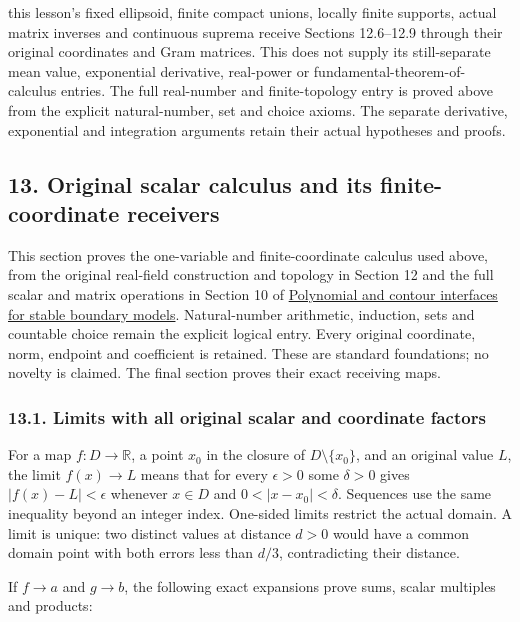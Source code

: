 \documentclass[
  11pt,
]{article}
\begin{document}
this lesson's fixed ellipsoid, finite compact unions, locally finite
supports, actual matrix inverses and continuous suprema receive Sections
12.6--12.9 through their original coordinates and Gram matrices. This
does not supply its still-separate mean value, exponential derivative,
real-power or fundamental-theorem-of-calculus entries. The full
real-number and finite-topology entry is proved above from the explicit
natural-number, set and choice axioms. The separate derivative,
exponential and integration arguments retain their actual hypotheses and
proofs.

\subsection{13. Original scalar calculus and its finite-coordinate
receivers}\label{original-scalar-calculus-and-its-finite-coordinate-receivers}

This section proves the one-variable and finite-coordinate calculus used
above, from the original real-field construction and topology in Section
12 and the full scalar and matrix operations in Section 10 of
\href{stable-prerequisite-bridges.md\#full-finite-linear-algebra-foundations}{Polynomial
and contour interfaces for stable boundary models}. Natural-number
arithmetic, induction, sets and countable choice remain the explicit
logical entry. Every original coordinate, norm, endpoint and coefficient
is retained. These are standard foundations; no novelty is claimed. The
final section proves their exact receiving maps.

\subsubsection{13.1. Limits with all original scalar and coordinate
factors}\label{limits-with-all-original-scalar-and-coordinate-factors}

For a map \(f:D\to\mathbb R\), a point \(x_0\) in the closure of
\(D\setminus\{x_0\}\), and an original value \(L\), the limit
\(f(x)\to L\) means that for every \(\epsilon>0\) some \(\delta>0\)
gives \(|f(x)-L|<\epsilon\) whenever \(x\in D\) and
\(0<|x-x_0|<\delta\). Sequences use the same inequality beyond an
integer index. One-sided limits restrict the actual domain. A limit is
unique: two distinct values at distance \(d>0\) would have a common
domain point with both errors less than \(d/3\), contradicting their
distance.

If \(f\to a\) and \(g\to b\), the following exact expansions prove sums,
scalar multiples and products:
\end{document}
